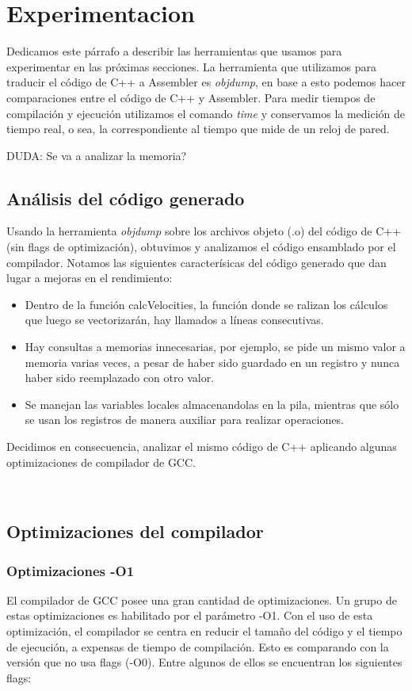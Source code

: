 \section{Experimentacion}

Dedicamos este párrafo a describir las herramientas que usamos para experimentar en las próximas secciones. La herramienta que utilizamos para traducir el código de C++ a Assembler es \textit{objdump}, en base a esto podemos hacer comparaciones entre el código de C++ y Assembler. Para medir tiempos de compilación y ejecución utilizamos el comando \textit{time} y conservamos la medición de tiempo real, o sea, la correspondiente al tiempo que mide de un reloj de pared.

\colorbox{BurntOrange}{DUDA: Se va a analizar la memoria?}


\subsection{Análisis del código generado}

Usando la herramienta \textit{objdump} sobre los archivos objeto (.o) del código de C++ (sin flags de optimización), obtuvimos y analizamos el código ensamblado por el compilador. Notamos las siguientes caracterísicas del código generado que dan lugar a mejoras en el rendimiento:
\begin{itemize}
	\item Dentro de la función calcVelocities, la función donde se ralizan los cálculos que luego se vectorizarán, hay llamados a líneas consecutivas.
	\item Hay consultas a memorias innecesarias, por ejemplo, se pide un mismo valor a memoria varias veces, a pesar de haber sido guardado en un registro y nunca haber sido reemplazado con otro valor.
	\item Se manejan las variables locales almacenandolas en la pila, mientras que sólo se usan los registros de manera auxiliar para realizar operaciones.
\end{itemize}
Decidimos en consecuencia, analizar el mismo código de C++ aplicando algunas optimizaciones de compilador de GCC.

~\\

\subsection{Optimizaciones del compilador}


\subsubsection{Optimizaciones -O1}
El compilador de GCC posee una gran cantidad de optimizaciones. Un grupo de estas optimizaciones es habilitado por el parámetro -O1. Con el uso de esta optimización, el compilador se centra en reducir el tamaño del código y el tiempo de ejecución, a expensas de tiempo de compilación. Esto es comparando con la versión que no usa flags (-O0). Entre algunos de ellos se encuentran los siguientes flags:

